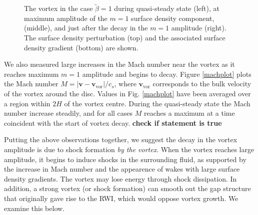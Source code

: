 \begin{figure}
{  }
  \hfill
  \caption{The vortex in the case $\tilde{\beta}=1$
    during quasi-steady state (left), at maximum amplitude of the
    $m=1$ surface density component, 
    (middle), and just after the decay in the $m=1$ amplitude
    (right). The surface density perturbation
    (top) and the associated surface density gradient (bottom) are shown.
    \label{shockplot}}
\end{figure}

We also measured large increases in the Mach number near
the vortex as it reaches maximum $m=1$ amplitude and begins to decay. 
Figure \ref{machplot} plots the Mach number $M=|\bm{v} -
\bm{v}_\mathrm{vor}|/c_s$, where 
$\bm{v}_\mathrm{vor}$ corresponds to the bulk velocity of the vortex
around the disc. Values in Fig. \ref{machplot} have been averaged over
a region within $2H$ of the vortex centre. 
During the quasi-steady state the Mach number increase
steadily, and for all cases $M$ reaches a maximum at 
a time coincident with the start of vortex decay. {\bf check if
  statement is true}

Putting the above observations together, we suggest the decay
in the vortex amplitude is due to shock formation \emph{by the
  vortex}. When the vortex reaches large amplitude, it begins
to induce shocks in the surrounding fluid, as supported by the
increase in Mach number and the appearence of wakes with large surface
density gradients. The vortex may lose energy through shock
dissipation. In addition, a strong vortex (or shock formation) 
can smooth out the gap structure that originally gave rise to the
RWI, which would oppose vortex growth. We examine this below.

